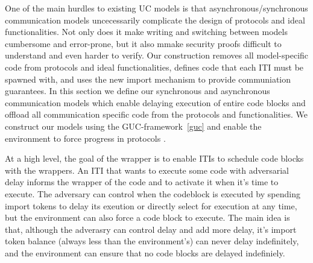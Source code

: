 
One of the main hurdles to existing UC models is that asynchronous/synchronous communication models uncecessarily complicate the design of protocols and ideal functionalities.
Not only does it make writing and switching between models cumbersome and error-prone, but it also mmake security proofs difficult to understand and even harder to verify.
Our construction removes all model-specific code from protocols and ideal functionalities, defines code that each ITI must be spawned with, and uses the new import mechanism to provide communiation guarantees.
In this section we define our synchronous and asynchronous communication models which enable delaying execution of entire code blocks and offload all communication specific code from the protocols and functionalities. 
We construct our models using the GUC-framework~\ref{guc} and enable the environment to force progress in protocols .

At a high level, the goal of the wrapper is to enable ITIs to schedule code blocks with the wrappers.
An ITI that wants to execute some code with adversarial delay informs the wrapper of the code and to activate it when it's time to execute.
The adversary can control when the codeblock is executed by spending import tokens to delay its exeution or directly select for execution at any time, but the environment can also force a code block to execute.
The main idea is that, although the adverasry can control delay and add more delay, it's import token balance (always less than the environment's) can never delay indefinitely, and the environment can ensure that no code blocks are delayed indefiniely.

